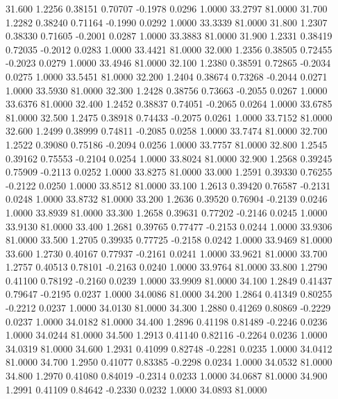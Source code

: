   31.600   1.2256   0.38151   0.70707  -0.1978   0.0296   1.0000  33.2797  81.0000
  31.700   1.2282   0.38240   0.71164  -0.1990   0.0292   1.0000  33.3339  81.0000
  31.800   1.2307   0.38330   0.71605  -0.2001   0.0287   1.0000  33.3883  81.0000
  31.900   1.2331   0.38419   0.72035  -0.2012   0.0283   1.0000  33.4421  81.0000
  32.000   1.2356   0.38505   0.72455  -0.2023   0.0279   1.0000  33.4946  81.0000
  32.100   1.2380   0.38591   0.72865  -0.2034   0.0275   1.0000  33.5451  81.0000
  32.200   1.2404   0.38674   0.73268  -0.2044   0.0271   1.0000  33.5930  81.0000
  32.300   1.2428   0.38756   0.73663  -0.2055   0.0267   1.0000  33.6376  81.0000
  32.400   1.2452   0.38837   0.74051  -0.2065   0.0264   1.0000  33.6785  81.0000
  32.500   1.2475   0.38918   0.74433  -0.2075   0.0261   1.0000  33.7152  81.0000
  32.600   1.2499   0.38999   0.74811  -0.2085   0.0258   1.0000  33.7474  81.0000
  32.700   1.2522   0.39080   0.75186  -0.2094   0.0256   1.0000  33.7757  81.0000
  32.800   1.2545   0.39162   0.75553  -0.2104   0.0254   1.0000  33.8024  81.0000
  32.900   1.2568   0.39245   0.75909  -0.2113   0.0252   1.0000  33.8275  81.0000
  33.000   1.2591   0.39330   0.76255  -0.2122   0.0250   1.0000  33.8512  81.0000
  33.100   1.2613   0.39420   0.76587  -0.2131   0.0248   1.0000  33.8732  81.0000
  33.200   1.2636   0.39520   0.76904  -0.2139   0.0246   1.0000  33.8939  81.0000
  33.300   1.2658   0.39631   0.77202  -0.2146   0.0245   1.0000  33.9130  81.0000
  33.400   1.2681   0.39765   0.77477  -0.2153   0.0244   1.0000  33.9306  81.0000
  33.500   1.2705   0.39935   0.77725  -0.2158   0.0242   1.0000  33.9469  81.0000
  33.600   1.2730   0.40167   0.77937  -0.2161   0.0241   1.0000  33.9621  81.0000
  33.700   1.2757   0.40513   0.78101  -0.2163   0.0240   1.0000  33.9764  81.0000
  33.800   1.2790   0.41100   0.78192  -0.2160   0.0239   1.0000  33.9909  81.0000
  34.100   1.2849   0.41437   0.79647  -0.2195   0.0237   1.0000  34.0086  81.0000
  34.200   1.2864   0.41349   0.80255  -0.2212   0.0237   1.0000  34.0130  81.0000
  34.300   1.2880   0.41269   0.80869  -0.2229   0.0237   1.0000  34.0182  81.0000
  34.400   1.2896   0.41198   0.81489  -0.2246   0.0236   1.0000  34.0244  81.0000
  34.500   1.2913   0.41140   0.82116  -0.2264   0.0236   1.0000  34.0319  81.0000
  34.600   1.2931   0.41099   0.82748  -0.2281   0.0235   1.0000  34.0412  81.0000
  34.700   1.2950   0.41077   0.83385  -0.2298   0.0234   1.0000  34.0532  81.0000
  34.800   1.2970   0.41080   0.84019  -0.2314   0.0233   1.0000  34.0687  81.0000
  34.900   1.2991   0.41109   0.84642  -0.2330   0.0232   1.0000  34.0893  81.0000
